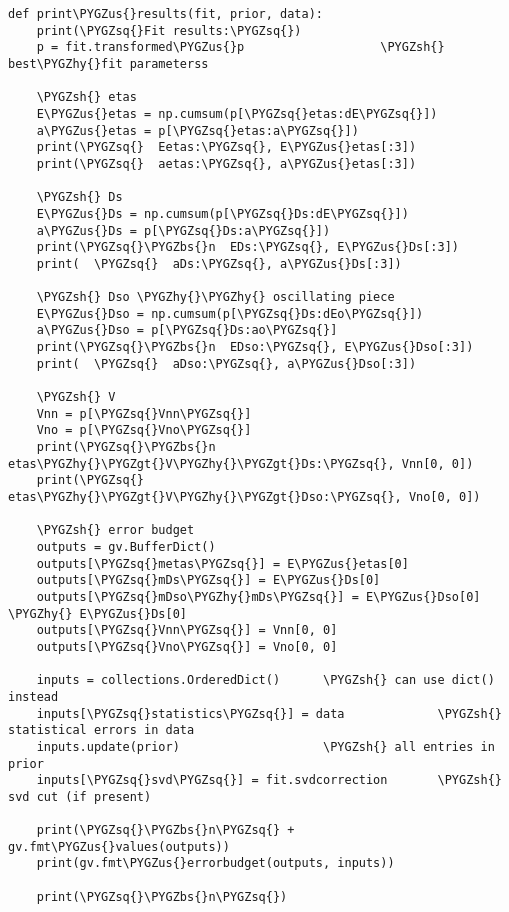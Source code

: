 \documentclass[letterpaper,10pt,english]{sphinxmanual}
\def\PYGZbs{\char`\\}
\def\PYGZus{\char`\_}
\def\PYGZgt{\char`\>}
\def\PYGZsh{\char`\#}
\def\PYGZhy{\char`\-}
\def\PYGZsq{\char`\'}
\begin{document}
\begin{Verbatim}[commandchars=\\\{\}]
def print\PYGZus{}results(fit, prior, data):
    print(\PYGZsq{}Fit results:\PYGZsq{})
    p = fit.transformed\PYGZus{}p                   \PYGZsh{} best\PYGZhy{}fit parameterss

    \PYGZsh{} etas
    E\PYGZus{}etas = np.cumsum(p[\PYGZsq{}etas:dE\PYGZsq{}])
    a\PYGZus{}etas = p[\PYGZsq{}etas:a\PYGZsq{}])
    print(\PYGZsq{}  Eetas:\PYGZsq{}, E\PYGZus{}etas[:3])
    print(\PYGZsq{}  aetas:\PYGZsq{}, a\PYGZus{}etas[:3])

    \PYGZsh{} Ds
    E\PYGZus{}Ds = np.cumsum(p[\PYGZsq{}Ds:dE\PYGZsq{}])
    a\PYGZus{}Ds = p[\PYGZsq{}Ds:a\PYGZsq{}])
    print(\PYGZsq{}\PYGZbs{}n  EDs:\PYGZsq{}, E\PYGZus{}Ds[:3])
    print(  \PYGZsq{}  aDs:\PYGZsq{}, a\PYGZus{}Ds[:3])

    \PYGZsh{} Dso \PYGZhy{}\PYGZhy{} oscillating piece
    E\PYGZus{}Dso = np.cumsum(p[\PYGZsq{}Ds:dEo\PYGZsq{}])
    a\PYGZus{}Dso = p[\PYGZsq{}Ds:ao\PYGZsq{}]
    print(\PYGZsq{}\PYGZbs{}n  EDso:\PYGZsq{}, E\PYGZus{}Dso[:3])
    print(  \PYGZsq{}  aDso:\PYGZsq{}, a\PYGZus{}Dso[:3])

    \PYGZsh{} V
    Vnn = p[\PYGZsq{}Vnn\PYGZsq{}]
    Vno = p[\PYGZsq{}Vno\PYGZsq{}]
    print(\PYGZsq{}\PYGZbs{}n  etas\PYGZhy{}\PYGZgt{}V\PYGZhy{}\PYGZgt{}Ds:\PYGZsq{}, Vnn[0, 0])
    print(\PYGZsq{}  etas\PYGZhy{}\PYGZgt{}V\PYGZhy{}\PYGZgt{}Dso:\PYGZsq{}, Vno[0, 0])

    \PYGZsh{} error budget
    outputs = gv.BufferDict()
    outputs[\PYGZsq{}metas\PYGZsq{}] = E\PYGZus{}etas[0]
    outputs[\PYGZsq{}mDs\PYGZsq{}] = E\PYGZus{}Ds[0]
    outputs[\PYGZsq{}mDso\PYGZhy{}mDs\PYGZsq{}] = E\PYGZus{}Dso[0] \PYGZhy{} E\PYGZus{}Ds[0]
    outputs[\PYGZsq{}Vnn\PYGZsq{}] = Vnn[0, 0]
    outputs[\PYGZsq{}Vno\PYGZsq{}] = Vno[0, 0]

    inputs = collections.OrderedDict()      \PYGZsh{} can use dict() instead
    inputs[\PYGZsq{}statistics\PYGZsq{}] = data             \PYGZsh{} statistical errors in data
    inputs.update(prior)                    \PYGZsh{} all entries in prior
    inputs[\PYGZsq{}svd\PYGZsq{}] = fit.svdcorrection       \PYGZsh{} svd cut (if present)

    print(\PYGZsq{}\PYGZbs{}n\PYGZsq{} + gv.fmt\PYGZus{}values(outputs))
    print(gv.fmt\PYGZus{}errorbudget(outputs, inputs))

    print(\PYGZsq{}\PYGZbs{}n\PYGZsq{})
\end{Verbatim}
\end{document}
